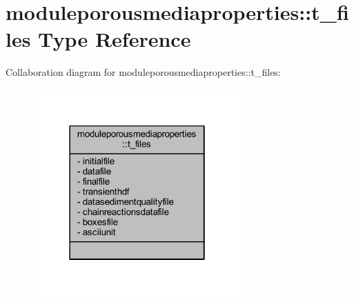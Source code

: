 \hypertarget{structmoduleporousmediaproperties_1_1t__files}{}\section{moduleporousmediaproperties\+:\+:t\+\_\+files Type Reference}
\label{structmoduleporousmediaproperties_1_1t__files}


Collaboration diagram for moduleporousmediaproperties\+:\+:t\+\_\+files\+:\nopagebreak
\begin{figure}[H]
\begin{center}
\leavevmode
\includegraphics[width=226pt]{structmoduleporousmediaproperties_1_1t__files__coll__graph}
\end{center}
\end{figure}
